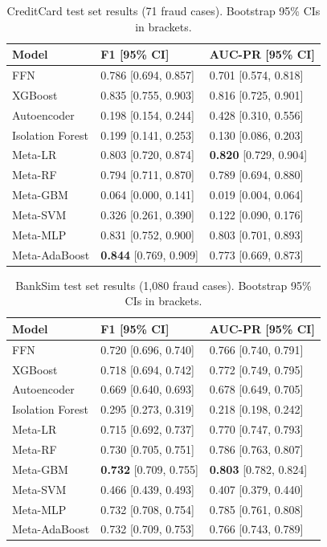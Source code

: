 \documentclass[11pt]{article}
\begin{document}
\begin{table}[h]
\centering
\caption{CreditCard test set results (71 fraud cases). Bootstrap 95\% CIs in brackets.}
\label{tab:cc}
\small
\begin{tabular}{lll}
\toprule
Model & F1 [95\% CI] & AUC-PR [95\% CI] \\
\midrule
FFN              & 0.786 [0.694, 0.857] & 0.701 [0.574, 0.818] \\
XGBoost          & 0.835 [0.755, 0.903] & 0.816 [0.725, 0.901] \\
Autoencoder      & 0.198 [0.154, 0.244] & 0.428 [0.310, 0.556] \\
Isolation Forest & 0.199 [0.141, 0.253] & 0.130 [0.086, 0.203] \\
Meta-LR          & 0.803 [0.720, 0.874] & \textbf{0.820} [0.729, 0.904] \\
Meta-RF          & 0.794 [0.711, 0.870] & 0.789 [0.694, 0.880] \\
Meta-GBM         & 0.064 [0.000, 0.141] & 0.019 [0.004, 0.064] \\
Meta-SVM         & 0.326 [0.261, 0.390] & 0.122 [0.090, 0.176] \\
Meta-MLP         & 0.831 [0.752, 0.900] & 0.803 [0.701, 0.893] \\
Meta-AdaBoost    & \textbf{0.844} [0.769, 0.909] & 0.773 [0.669, 0.873] \\
\bottomrule
\end{tabular}
\end{table}

\begin{table}[h]
\centering
\caption{BankSim test set results (1,080 fraud cases). Bootstrap 95\% CIs in brackets.}
\label{tab:bs}
\small
\begin{tabular}{lll}
\toprule
Model & F1 [95\% CI] & AUC-PR [95\% CI] \\
\midrule
FFN              & 0.720 [0.696, 0.740] & 0.766 [0.740, 0.791] \\
XGBoost          & 0.718 [0.694, 0.742] & 0.772 [0.749, 0.795] \\
Autoencoder      & 0.669 [0.640, 0.693] & 0.678 [0.649, 0.705] \\
Isolation Forest & 0.295 [0.273, 0.319] & 0.218 [0.198, 0.242] \\
Meta-LR          & 0.715 [0.692, 0.737] & 0.770 [0.747, 0.793] \\
Meta-RF          & 0.730 [0.705, 0.751] & 0.786 [0.763, 0.807] \\
Meta-GBM         & \textbf{0.732} [0.709, 0.755] & \textbf{0.803} [0.782, 0.824] \\
Meta-SVM         & 0.466 [0.439, 0.493] & 0.407 [0.379, 0.440] \\
Meta-MLP         & 0.732 [0.708, 0.754] & 0.785 [0.761, 0.808] \\
Meta-AdaBoost    & 0.732 [0.709, 0.753] & 0.766 [0.743, 0.789] \\
\bottomrule
\end{tabular}
\end{table}
\end{document}
